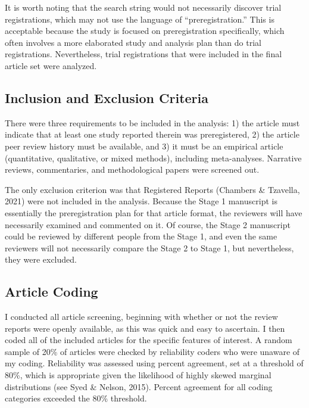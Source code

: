 \documentclass[authordate, meta, issue]{jote-new-article}
\begin{document}
	It is worth noting that the search string would not necessarily discover trial registrations, which may not use the language of “preregistration.” This is acceptable because the study is focused on preregistration specifically, which often involves a more elaborated study and analysis plan than do trial registrations. Nevertheless, trial registrations that were included in the final article set were analyzed.



	\subsection{Inclusion and Exclusion Criteria}



	There were three requirements to be included in the analysis: 1) the article must indicate that at least one study reported therein was preregistered, 2) the article peer review history must be available, and 3) it must be an empirical article (quantitative, qualitative, or mixed methods), including meta-analyses. Narrative reviews, commentaries, and methodological papers were screened out.



	The only exclusion criterion was that Registered Reports (Chambers \& Tzavella, 2021) were not included in the analysis. Because the Stage 1 manuscript is essentially the preregistration plan for that article format, the reviewers will have necessarily examined and commented on it. Of course, the Stage 2 manuscript could be reviewed by different people from the Stage 1, and even the same reviewers will not necessarily compare the Stage 2 to Stage 1, but nevertheless, they were excluded.



	\subsection{Article Coding}



	I conducted all article screening, beginning with whether or not the review reports were openly available, as this was quick and easy to ascertain. I then coded all of the included articles for the specific features of interest. A random sample of 20\% of articles were checked by reliability coders who were unaware of my coding. Reliability was assessed using percent agreement, set at a threshold of 80\%, which is appropriate given the likelihood of highly skewed marginal distributions (see Syed \& Nelson, 2015). Percent agreement for all coding categories exceeded the 80\% threshold.
\end{document}

